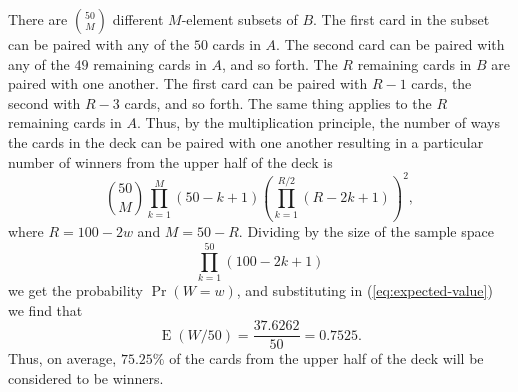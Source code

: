 \documentclass[a4paper,12pt]{article}
\DeclareMathOperator*{\E}{E}
\begin{document}
There are ${50 \choose M}$ different $M$-element subsets of $B$.  The
first card in the subset can be paired with any of the $50$ cards in
$A$.  The second card can be paired with any of the $49$ remaining
cards in $A$, and so forth.  The $R$ remaining cards in $B$ are paired
with one another.  The first card can be paired with $R-1$ cards, the
second with $R-3$ cards, and so forth.  The same thing applies to the
$R$ remaining cards in $A$.  Thus, by the multiplication principle,
the number of ways the cards in the deck can be paired with one
another resulting in a particular number of winners from the upper
half of the deck is
\begin{equation*}
  {50 \choose M} \prod^M_{k = 1} (50 - k + 1)
  \left( \prod^{R / 2}_{k = 1} (R - 2k + 1) \right)^2 ,
\end{equation*}
where $R = 100 - 2w$ and $M = 50 - R$.  Dividing by the size of the
sample space
\begin{equation*}
  \prod^{50}_{k = 1} (100 - 2k + 1)
\end{equation*}
we get the probability $\Pr(W = w)$, and substituting in
(\ref{eq:expected-value}) we find that
\begin{equation*}
  \E(W/50) = \frac{37.6262}{50} = 0.7525 .
\end{equation*}
Thus, on average, $75.25\%$ of the cards from the upper half of the
deck will be considered to be winners.

%   
\end{document}
